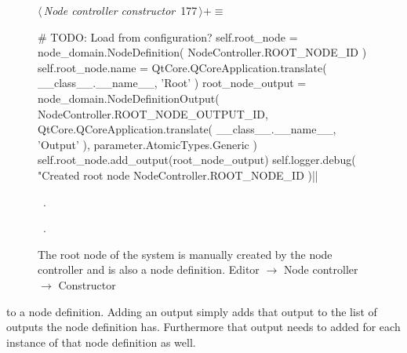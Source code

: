 \documentclass[%
    a4paper,    %
    justified,  %
    nobib,      %
    openany     %
]{tufte-book}
\makeatletter
\renewcommand{\label}[1]{\@tufte@label{##1}}%
\makeatother
\begin{document}
\begin{figure}[!htbp]
\begin{flushleft} \small
\begin{minipage}{\linewidth}\label{scrap148}\raggedright\small
{} $\langle\,${\itshape Node controller constructor}\nobreak\ {\footnotesize {177}}$\,\rangle+\equiv$
\vspace{-1ex}
\begin{pythoncode}
    # TODO: Load from configuration?
    self.root_node = node_domain.NodeDefinition(
        NodeController.ROOT_NODE_ID
    )
    self.root_node.name = QtCore.QCoreApplication.translate(
        __class__.__name__,
        'Root'
    )
    root_node_output = node_domain.NodeDefinitionOutput(
        NodeController.ROOT_NODE_OUTPUT_ID,
        QtCore.QCoreApplication.translate(
            __class__.__name__,
            'Output'
        ),
        parameter.AtomicTypes.Generic
    )
    self.root_node.add_output(root_node_output)
    self.logger.debug(
        "Created root node %
        NodeController.ROOT_NODE_ID
    )|\NWsep|
\end{pythoncode}
\vspace{1.5ex}
\footnotesize
\begin{list}{}{\setlength{\itemsep}{-\parsep}\setlength{\itemindent}{-\leftmargin}}
\item \NWtxtMacroDefBy\ .
\item \NWtxtMacroRefIn\ .

\item{}
\end{list}
\end{minipage}\vspace{4ex}
\end{flushleft}
\caption{The root node of the system is manually created by the node controller
  and is also a node definition.
  \newline{}\newline{}Editor $\rightarrow$ Node controller $\rightarrow$
  Constructor}
\end{figure}

 to a node
definition. Adding an output simply adds that output to the list of outputs the
node definition has. Furthermore that output needs to added for each instance of
that node definition as well.
\end{document}
